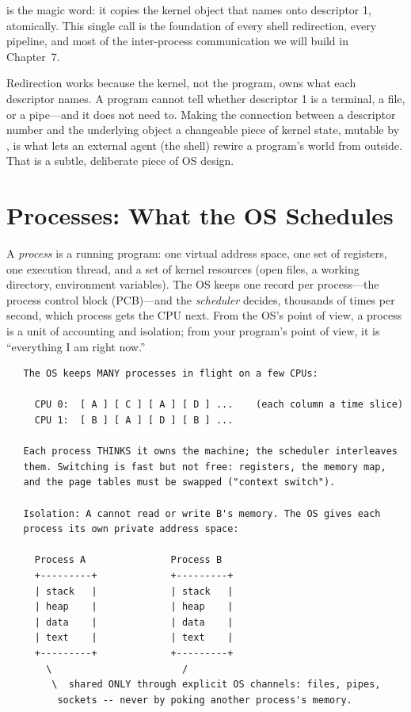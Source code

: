  is the magic word: it copies the kernel object that
 names onto descriptor 1, atomically. This single call is the
foundation of every shell redirection, every pipeline, and most of the
inter-process communication we will build in Chapter~7.

\begin{osconcept}
Redirection works because the kernel, not the program, owns what each
descriptor names. A program cannot tell whether descriptor 1 is a
terminal, a file, or a pipe---and it does not need to. Making the
connection between a descriptor number and the underlying object a
changeable piece of kernel state, mutable by , is what lets
an external agent (the shell) rewire a program's world from outside.
That is a subtle, deliberate piece of OS design.
\end{osconcept}

\section{Processes: What the OS Schedules}

A \emph{process} is a running program: one virtual address space, one
set of registers, one execution thread, and a set of kernel resources
(open files, a working directory, environment variables). The OS keeps
one record per process---the process control block (PCB)---and the
\emph{scheduler} decides, thousands of times per second, which process
gets the CPU next. From the OS's point of view, a process is a unit of
accounting and isolation; from your program's point of view, it is
``everything I am right now.''

\begin{verbatim}
   The OS keeps MANY processes in flight on a few CPUs:

     CPU 0:  [ A ] [ C ] [ A ] [ D ] ...    (each column a time slice)
     CPU 1:  [ B ] [ A ] [ D ] [ B ] ...

   Each process THINKS it owns the machine; the scheduler interleaves
   them. Switching is fast but not free: registers, the memory map,
   and the page tables must be swapped ("context switch").

   Isolation: A cannot read or write B's memory. The OS gives each
   process its own private address space:

     Process A               Process B
     +---------+             +---------+
     | stack   |             | stack   |
     | heap    |             | heap    |
     | data    |             | data    |
     | text    |             | text    |
     +---------+             +---------+
       \                       /
        \  shared ONLY through explicit OS channels: files, pipes,
         sockets -- never by poking another process's memory.
\end{verbatim}

